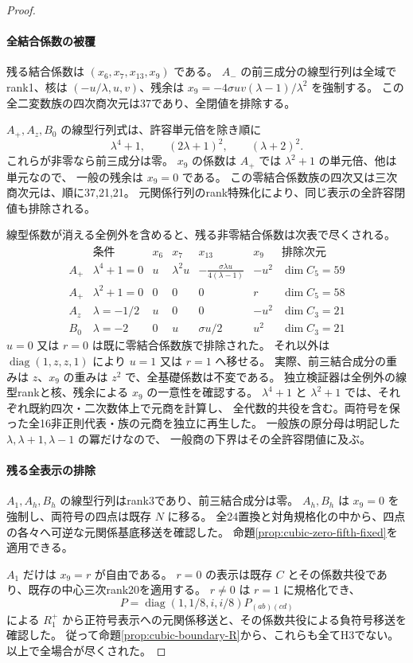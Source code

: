 \begin{proof}
\paragraph{全結合係数の被覆}
残る結合係数は $(x_6,x_7,x_{13},x_9)$ である。
$A_-$ の前三成分の線型行列は全域でrank1、核は
$(-u/\lambda,u,v)$、残余は
$x_9=-4\sigma uv(\lambda-1)/\lambda^2$ を強制する。
この全二変数族の四次商次元は37であり、全閉値を排除する。

$A_+,A_z,B_0$ の線型行列式は、許容単元倍を除き順に
\[
 \lambda^4+1,\qquad(2\lambda+1)^2,\qquad(\lambda+2)^2.
\]
これらが非零なら前三成分は零。
$x_9$ の係数は $A_+$ では $\lambda^2+1$ の単元倍、他は単元なので、
一般の残余は $x_9=0$ である。
この零結合係数族の四次又は三次商次元は、順に37,21,21。
元関係行列のrank特殊化により、同じ表示の全許容閉値も排除される。

線型係数が消える全例外を含めると、残る非零結合係数は次表で尽くされる。
\[
\begin{array}{c|c|c|c|c|c|c}
 &\text{条件}&x_6&x_7&x_{13}&x_9&\text{排除次元}\\\hline
 A_+&\lambda^4+1=0&u&\lambda^2u&-\frac{\sigma\lambda u}{4(\lambda-1)}&-u^2&\dim C_5=59\\
 A_+&\lambda^2+1=0&0&0&0&r&\dim C_5=58\\
 A_z&\lambda=-1/2&u&0&0&-u^2&\dim C_3=21\\
 B_0&\lambda=-2&0&u&\sigma u/2&u^2&\dim C_3=21
\end{array}
\]
$u=0$ 又は $r=0$ は既に零結合係数族で排除された。
それ以外は $\operatorname{diag}(1,z,z,1)$ により $u=1$ 又は $r=1$ へ移せる。
実際、前三結合成分の重みは $z$、$x_9$ の重みは $z^2$ で、全基礎係数は不変である。
独立検証器は全例外の線型rankと核、残余による $x_9$ の一意性を確認する。
$\lambda^4+1$ と $\lambda^2+1$ では、それぞれ既約四次・二次数体上で元商を計算し、
全代数的共役を含む。両符号を保った全16非正則代表・族の元商を独立に再生した。
一般族の原分母は明記した $\lambda,\lambda+1,\lambda-1$ の冪だけなので、
一般商の下界はその全許容閉値に及ぶ。

\paragraph{残る全表示の排除}
$A_1,A_h,B_h$ の線型行列はrank3であり、前三結合成分は零。
$A_h,B_h$ は $x_9=0$ を強制し、両符号の四点は既存 $N$ に移る。
全24置換と対角規格化の中から、四点の各々へ可逆な元関係基底移送を確認した。
命題\ref{prop:cubic-zero-fifth-fixed}を適用できる。

$A_1$ だけは $x_9=r$ が自由である。
$r=0$ の表示は既存 $C$ とその係数共役であり、既存の中心三次rank20を適用する。
$r\ne0$ は $r=1$ に規格化でき、
\[
 P=\operatorname{diag}(1,1/8,i,i/8)P_{(ab)(cd)}
\]
による $R^+_1$ から正符号表示への元関係移送と、その係数共役による負符号移送を確認した。
従って命題\ref{prop:cubic-boundary-R}から、これらも全てH3でない。
以上で全場合が尽くされた。
\end{proof}

